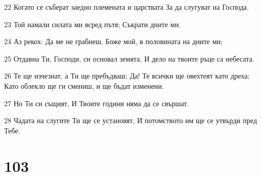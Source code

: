 \par 22 Когато се съберат заедно племената и царствата За да слугуват на Господа.
\par 23 Той намали силата ми всред пътя; Съкрати дните ми.
\par 24 Аз рекох: Да ме не грабнеш, Боже мой, в половината на дните ми;
\par 25 Отдавна Ти, Господи, си основал земята, И дело на твоите ръце са небесата.
\par 26 Те ще изчезнат, а Ти ще пребъдваш; Да! Те всички ще овехтеят като дреха; Като облекло ще ги смениш, и ще бъдат изменени.
\par 27 Но Ти си същият, И Твоите години няма да се свършат.
\par 28 Чадата на слугите Ти ще се установят, И потомството им ще се утвърди пред Тебе.

\chapter{103}

